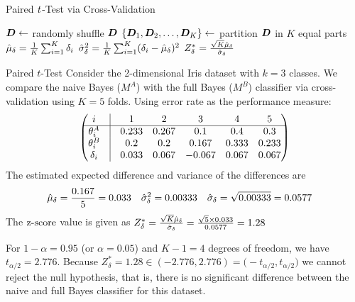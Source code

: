 \newcommand{\algpairedTtest}{\textsc{Paired $t$-Test}}
\begin{frame}[fragile]{Paired ${\it t}$-Test via Cross-Validation}
\begin{tightalgo}[H]{\textwidth-18pt}
\SetKwInOut{Algorithm}{\algpairedTtest ($\alpha$, $K$, $\bD$)}
\Algorithm{}
${\boldsymbol D} \gets $ randomly shuffle $\bD$\;
$\{{\boldsymbol D}_1, {\boldsymbol D}_2, \ldots, {\boldsymbol D}_K\} \gets$ partition $\bD$ in $K$ equal parts\;
$\hat{\mu}_\delta = {1\over K} \sum_{i=1}^K \delta_i$\;
$\hat{\sigma}^2_\delta  = {1\over K} \sum_{i=1}^K (\delta_i - \hat{\mu}_\delta)^2$\;
$Z^*_\delta = {\sqrt{K} \hat{\mu}_\delta \over \hat{\sigma}_\delta}$\;
\end{tightalgo}
\end{frame}


\begin{frame}[fragile]{Paired $t$-Test}
Consider the 2-dimensional Iris dataset 
  with $k=3$ classes. We compare
  the naive Bayes ($M^A$) with the full Bayes ($M^B$) classif\/{i}er via
  cross-validation using $K=5$ folds. Using error rate as the performance
  measure:
  \begin{align*}
    \matr{
     i  & \vline & 1 & 2 & 3 & 4 & 5\\
     \hline
    \theta_i^A & \vline & 0.233 & 0.267 & 0.1 & 0.4 & 0.3\\
    \theta_i^B & \vline & 0.2 & 0.2 & 0.167 & 0.333 & 0.233\\
    \delta_i & \vline & 0.033 & 0.067 & -0.067 & 0.067 & 0.067\\
    }
  \end{align*}
The estimated expected difference and variance of the differences are
  \begin{align*}
    \hat{\mu}_\delta & = {0.167 \over 5} = 0.033 &
    \hat{\sigma}^2_\delta & = 0.00333 &
    \hat{\sigma}_\delta & = \sqrt{0.00333} = 0.0577
  \end{align*}
  The $\operatorname{z\text{-}score}$ value is given as
  $ Z^*_\delta = {\sqrt{K} \hat{\mu}_\delta \over \hat{\sigma}_\delta} =
    {\sqrt{5} \times 0.033 \over 0.0577 } = 1.28 $

  For $1-\alpha=0.95$ (or
  $\alpha=0.05$) and
  $K-1=4$ degrees of freedom, we have
  $t_{\alpha/2} = 2.776$.
  Because $Z^*_\delta = 1.28 \in (-2.776, 2.776) =
  \bigl(-t_{\alpha/2}, t_{\alpha/2}\bigr)$ we cannot reject the null
  hypothesis, that  is,
there is no signif\/{i}cant difference
  between the naive and full Bayes classif\/{i}er for this dataset.

\end{frame}


